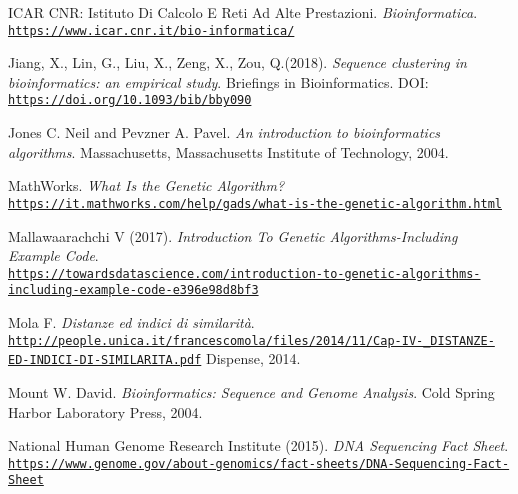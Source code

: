\documentclass[twoside,openright,titlepage,fleqn,
,	headinclude,12pt,a4paper,BCOR5mm,footinclude,table]{scrbook}
\newcommand{\?}{'\-\nobreak\hspace{0pt}}
\begin{document}
\begin{thebibliography}{50}
ICAR CNR: Istituto Di Calcolo E Reti Ad Alte Prestazioni.\newline
\textit{Bioinformatica}.
\\\texttt{\url{https://www.icar.cnr.it/bio-informatica/}}

Jiang, X., Lin, G., Liu, X., Zeng, X., Zou, Q.(2018).\newline
\textit{Sequence clustering in bioinformatics: an empirical study}.\newline
Briefings in Bioinformatics.\newline
DOI: \\\texttt{\url{https://doi.org/10.1093/bib/bby090}}

Jones C. Neil and Pevzner A. Pavel.\newline
\textit{An introduction to bioinformatics algorithms}.\newline
Massachusetts, Massachusetts Institute of Technology, 2004.

MathWorks.\newline
\textit{What Is the Genetic Algorithm?}
\\\texttt{\url{https://it.mathworks.com/help/gads/what-is-the-genetic-algorithm.html}}

Mallawaarachchi V (2017).\newline
\textit{Introduction To Genetic Algorithms-Including Example Code}.
\\\texttt{\url{https://towardsdatascience.com/introduction-to-genetic-algorithms-including-example-code-e396e98d8bf3}}

Mola F.\newline
\textit{Distanze ed indici di similarità}.
\\\texttt{\url{http://people.unica.it/francescomola/files/2014/11/Cap-IV-_DISTANZE-ED-INDICI-DI-SIMILARITA.pdf}}
Dispense, 2014.

Mount W. David.\newline
\textit{Bioinformatics: Sequence and Genome Analysis}.\newline
Cold Spring Harbor Laboratory Press, 2004.

National Human Genome Research Institute (2015).\newline
\textit{DNA Sequencing Fact Sheet}.
\\\texttt{\url{https://www.genome.gov/about-genomics/fact-sheets/DNA-Sequencing-Fact-Sheet}}


\end{thebibliography}
\end{document}
